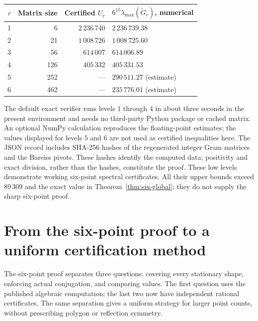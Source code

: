 \documentclass[11pt]{article}
\theoremstyle{remark}
\numberwithin{equation}{section}
\begin{document}
\begin{center}
\begin{tabular}{rrrl}
\toprule
$r$ & Matrix size & Certified $U_r$ &
 $6^{15}\lambda_{\max}(\widetilde G_r)$, numerical\\
\midrule
1 & 6   & $2\,236\,740$ & $2\,236\,739.38$\\
2 & 21  & $1\,008\,726$ & $1\,008\,725.60$\\
3 & 56  & $614\,007$    & $614\,006.89$\\
4 & 126 & $405\,332$    & $405\,331.53$\\
5 & 252 & ---           & $290\,511.27$ (estimate)\\
6 & 462 & ---           & $235\,776.01$ (estimate)\\
\bottomrule
\end{tabular}
\end{center}
The default exact verifier runs levels $1$ through $4$ in about
three seconds in the present environment and needs no third-party
Python package or cached matrix. An optional NumPy calculation
reproduces the floating-point estimates; the values displayed for
levels $5$ and $6$ are not used as certified inequalities here.
The JSON record includes SHA-256 hashes of the regenerated integer
Gram matrices and the Bareiss pivots. These hashes identify the
computed data; positivity and exact division, rather than the hashes,
constitute the proof. These low levels demonstrate working
six-point spectral certificates. All their upper bounds exceed
$89\,309$ and the exact value in Theorem~\ref{thm:six-global};
they do not supply the sharp six-point proof.


\section{From the six-point proof to a uniform certification method}
\label{sec:six-to-uniform}

The six-point proof separates three questions: covering every stationary
shape, enforcing actual conjugation, and comparing values.  The first
question uses the published algebraic computation; the last two now
have independent rational certificates.  The same separation gives a
uniform strategy for larger point counts, without prescribing polygon
or reflection symmetry.
\end{document}
